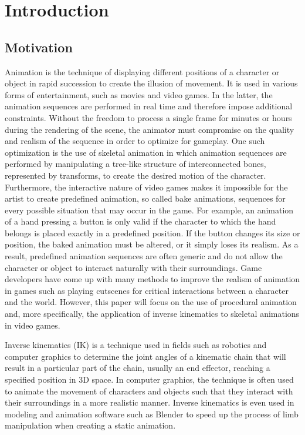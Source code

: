\chapter{Introduction}
\section{Motivation} 
Animation is the technique of displaying different positions of a character or
object in rapid succession to create the illusion of movement. It is used in
various forms of entertainment, such as movies and video games. In the latter,
the animation sequences are performed in real time and therefore impose
additional constraints. Without the freedom to process a single frame for
minutes or hours during the rendering of the scene, the animator must compromise
on the quality and realism of the sequence in order to optimize for gameplay.
One such optimization is the use of skeletal animation in which animation
sequences are performed by manipulating a tree-like structure of interconnected
bones, represented by transforms, to create the desired motion of the character.
Furthermore, the interactive nature of video games makes it impossible for the
artist to create predefined animation, so called bake animations, sequences for
every possible situation that may occur in the game. For example, an animation
of a hand pressing a button is only valid if the character to which the hand
belongs is placed exactly in a predefined position. If the button changes its
size or position, the baked animation must be altered, or it simply loses its
realism. As a result, predefined animation sequences are often generic and do
not allow the character or object to interact naturally with their surroundings.
Game developers have come up with many methods to improve the realism of
animation in games such as playing cutscenes for critical interactions between
a character and the world. However, this paper will focus on the use of
procedural animation and, more specifically, the application of inverse
kinematics to skeletal animations in video games.

Inverse kinematics (IK) is a technique used in fields such as robotics and computer
graphics to determine the joint angles of a kinematic chain that will result in
a particular part of the chain, usually an end effector, reaching a specified
position in 3D space. In computer graphics, the technique is often used to
animate the movement of characters and objects such that they interact with
their surroundings in a more realistic manner. Inverse kinematics is even used
in modeling and animation software such as Blender \cite{blender_ik2} to speed
up the process of limb manipulation when creating a static animation.

